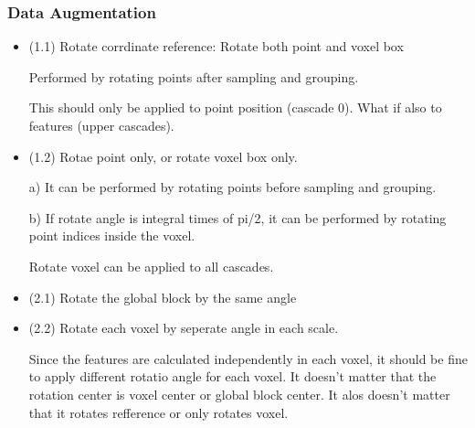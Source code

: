 \documentclass{article}
\begin{document}
\subsubsection{Data Augmentation} 
\begin{itemize}
\item (1.1) Rotate corrdinate reference: Rotate both point and voxel box \par
Performed by rotating points after sampling and grouping. \par
This should only be applied to point position (cascade 0). What if also to features (upper cascades).

\item (1.2) Rotae point only, or rotate voxel box only. \par
a) It can be performed by rotating points before sampling and grouping.\par
b) If rotate angle is integral times of pi/2, it can be performed by rotating point indices inside the voxel.\par
Rotate voxel can be applied to all cascades.
\item (2.1) Rotate the global block by the same angle
\item (2.2) Rotate each voxel by seperate angle in each scale.\par
Since the features are calculated independently in each voxel, it should be fine to apply different rotatio angle for each voxel. It doesn't matter that the rotation center is voxel center or global block center. It alos doesn't matter that it rotates refference or only rotates voxel.

\end{itemize}
\end{document}
